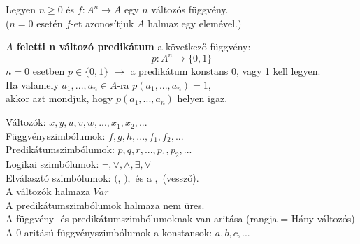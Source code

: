 \documentclass{beamer}
\newcommand{\msmallskip}{\vspace{0.3em}}
\begin{document}
\begin{frame}

\begin{tcolorbox}[title={Függvény}]
Legyen $n \geq 0$ és $f : A^n \rightarrow A$ egy $n$ változós függvény.\\
\tcblower
({\small $n = 0$ esetén $f$-et azonosítjuk $A$ halmaz egy elemével.})
\end{tcolorbox}

\begin{tcolorbox}[title={$A$ feletti n változó predikátum}]
\textbf{$A$ feletti n változó predikátum} a következő függvény:\\
$$p : A^n \rightarrow \{0, 1\}$$
\tcblower
{\small $n = 0$ esetben $p \in \{0, 1\}$ $\rightarrow$  a predikátum konstans 0, vagy 1 kell legyen.}\\
\msmallskip
{\small Ha valamely $a_1, ..., a_n \in A$-ra $p (a_1, ..., a_n) = 1$},\\
{\small akkor azt mondjuk, hogy $p(a_1, ..., a_n)$ helyen igaz.}
\end{tcolorbox}

\begin{tcolorbox}[title={Az $\mathcal{L}$ elsőrendű nyelv szimbólumai}]
Változók: $x, y, u, v, w, ..., x_1, x_2, ...$\\
Függvényszimbólumok: $f, g, h, ..., f_1, f_2, ...$\\
Predikátumszimbólumok: $p, q, r, ..., p_1, p_2, ...$\\
Logikai szimbólumok: ${\neg}, {\lor}, {\land}, {\exists}, {\forall}$\\
Elválasztó szimbólumok: $($, $),$ és a $,$ (vessző).\\
\tcblower
A változók halmaza $Var$\\
A predikátumszimbólumok halmaza nem üres.\\
A függvény- és predikátumszimbólumoknak van aritása (rangja = Hány változós)\\
A 0 aritású függvényszimbólumok a konstansok: $a, b, c, ...$
\end{tcolorbox}
\end{frame}
\end{document}
